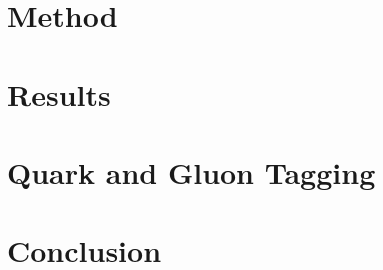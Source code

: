 \part{Method}


\part{Results}


\part{Quark and Gluon Tagging}


\part{Conclusion}



\nocite{*}

\singlespacing

\doublespacing


